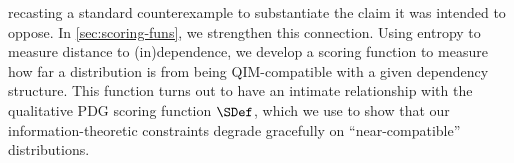 recasting a standard counterexample to substantiate the claim it was intended to oppose.
In \cref{sec:scoring-funs}, we strengthen this connection. Using entropy to measure distance to (in)dependence, we develop a scoring function to measure how far a distribution is from being QIM-compatible with a given dependency 
structure.  
This function turns out to have an intimate relationship with the qualitative PDG scoring function $\SDef$, which we use to 
show that our information-theoretic constraints degrade gracefully on ``near-compatible'' distributions.


